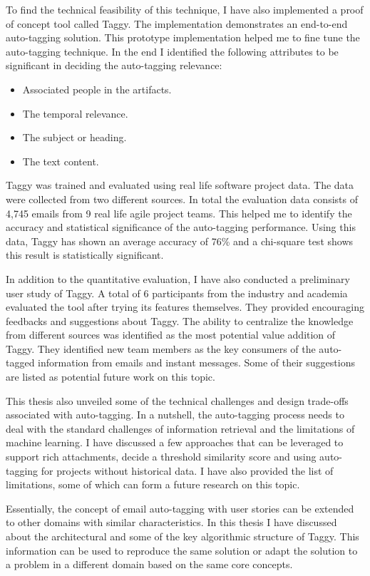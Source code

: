 To find the technical feasibility of this technique, I have also implemented a proof of concept tool called Taggy. The implementation demonstrates an end-to-end auto-tagging solution. This prototype implementation helped me to fine tune the auto-tagging technique. In the end I identified the following attributes to be significant in deciding the auto-tagging relevance:
\begin{itemize}
	\item Associated people in the artifacts.
	\item The temporal relevance.
	\item The subject or heading.
	\item The text content.	
\end{itemize}

Taggy was trained and evaluated using real life software project data. The data were collected from two different sources. In total the evaluation data consists of 4,745 emails from 9 real life agile project teams.  This helped me to identify the accuracy and statistical significance of the auto-tagging performance. Using this data, Taggy has shown an average accuracy of 76\% and a chi-square test shows this result is statistically significant.

In addition to the quantitative evaluation, I have also conducted a preliminary user study of Taggy. A total of 6 participants from the industry and academia evaluated the tool after trying its features themselves. They provided encouraging feedbacks and suggestions about Taggy. The ability to centralize the knowledge from different sources was identified as the most potential value addition of Taggy. They identified new team members as the key consumers of the auto-tagged information from emails and instant messages. Some of their suggestions are listed as potential future work on this topic.

This thesis also unveiled some of the technical challenges and design trade-offs associated with auto-tagging. In a nutshell, the auto-tagging process needs to deal with the standard challenges of information retrieval and the limitations of machine learning. I have discussed a few approaches that can be leveraged to support rich attachments, decide a threshold similarity score and using auto-tagging for projects without historical data. I have also provided the list of limitations, some of which can form a future research on this topic.

Essentially, the concept of email auto-tagging with user stories can be extended to other domains with similar characteristics. In this thesis I have discussed about the architectural and some of the key algorithmic structure of Taggy. This information can be used to reproduce the same solution or adapt the solution to a problem in a different domain based on the same core concepts.

